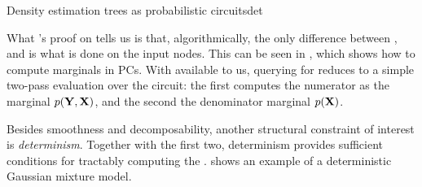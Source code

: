 \begin{example}[sidebyside,lefthand width=0.55\textwidth]{Density estimation trees as probabilistic circuits}{det}
\end{example}

What 's proof on  tells us is that, algorithmically, the
only difference between \evi{}, \mar{} and \con{} is what is done on the input nodes. This can be
seen in , which shows how to compute marginals in PCs. With \mar{} available to us,
querying for \con{} reduces to a simple two-pass evaluation over the circuit: the first computes
the numerator as the marginal $p(\mathbf{Y},\mathbf{X})$, and the second the denominator marginal
$p(\mathbf{X})$.

Besides smoothness and decomposability, another structural constraint of interest is
\emph{determinism}. Together with the first two, determinism provides sufficient conditions for
tractably computing the \map{}.  shows an example of a deterministic Gaussian
mixture model.

